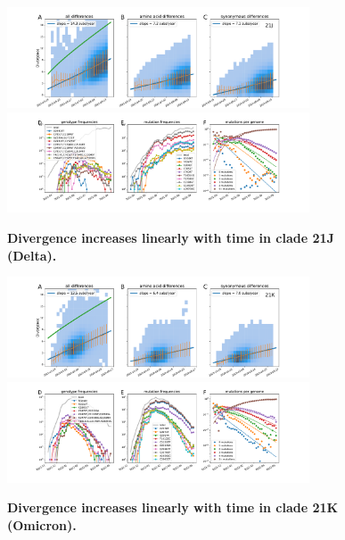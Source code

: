 \begin{figure}[h]
    \includegraphics[width=0.8\textwidth]{figures/rtt/21J_rtt.pdf}
    \includegraphics[width=0.8\textwidth]{figures/counts/21J_counts.pdf}
    \caption{{\bf Divergence increases linearly with time in clade 21J (Delta).}
    \label{fig:21J_divergence}}
\end{figure}

\begin{figure}[h]
    \includegraphics[width=0.8\textwidth]{figures/rtt/21K_rtt.pdf}
    \includegraphics[width=0.8\textwidth]{figures/counts/21K_counts.pdf}
    \caption{{\bf Divergence increases linearly with time in clade 21K (Omicron).}
    \label{fig:21K_divergence}}
\end{figure}

